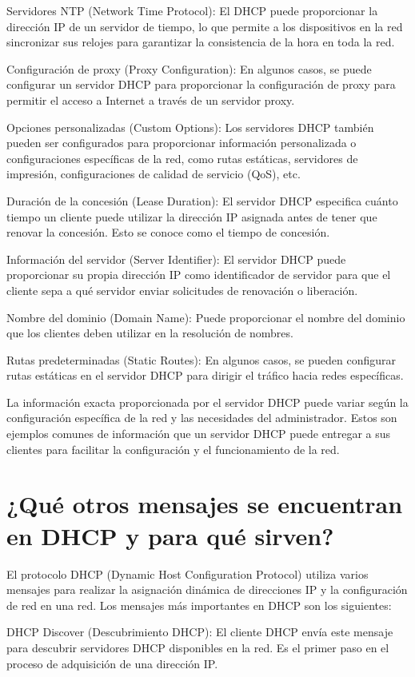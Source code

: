 	Servidores NTP (Network Time Protocol): El DHCP puede proporcionar la dirección IP de un servidor de tiempo, lo que permite a los dispositivos en la red sincronizar sus relojes para garantizar la consistencia de la hora en toda la red.
	
	Configuración de proxy (Proxy Configuration): En algunos casos, se puede configurar un servidor DHCP para proporcionar la configuración de proxy para permitir el acceso a Internet a través de un servidor proxy.
	
	Opciones personalizadas (Custom Options): Los servidores DHCP también pueden ser configurados para proporcionar información personalizada o configuraciones específicas de la red, como rutas estáticas, servidores de impresión, configuraciones de calidad de servicio (QoS), etc.
	
	Duración de la concesión (Lease Duration): El servidor DHCP especifica cuánto tiempo un cliente puede utilizar la dirección IP asignada antes de tener que renovar la concesión. Esto se conoce como el tiempo de concesión.
	
	Información del servidor (Server Identifier): El servidor DHCP puede proporcionar su propia dirección IP como identificador de servidor para que el cliente sepa a qué servidor enviar solicitudes de renovación o liberación.
	
	Nombre del dominio (Domain Name): Puede proporcionar el nombre del dominio que los clientes deben utilizar en la resolución de nombres.
	
	Rutas predeterminadas (Static Routes): En algunos casos, se pueden configurar rutas estáticas en el servidor DHCP para dirigir el tráfico hacia redes específicas.
	
	La información exacta proporcionada por el servidor DHCP puede variar según la configuración específica de la red y las necesidades del administrador. Estos son ejemplos comunes de información que un servidor DHCP puede entregar a sus clientes para facilitar la configuración y el funcionamiento de la red.
	\section{¿Qué otros mensajes se encuentran en DHCP y para qué sirven?}
	El protocolo DHCP (Dynamic Host Configuration Protocol) utiliza varios mensajes para realizar la asignación dinámica de direcciones IP y la configuración de red en una red. Los mensajes más importantes en DHCP son los siguientes:
	
	DHCP Discover (Descubrimiento DHCP): El cliente DHCP envía este mensaje para descubrir servidores DHCP disponibles en la red. Es el primer paso en el proceso de adquisición de una dirección IP.
	
